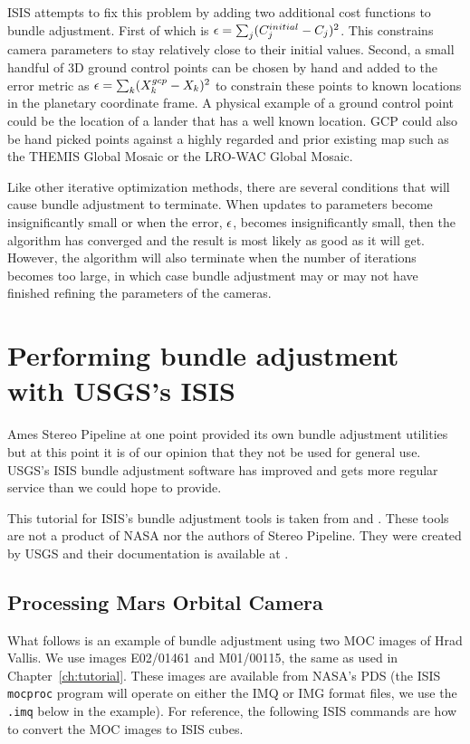 \ac{ISIS} attempts to fix this problem by adding two additional cost
functions to bundle adjustment. First of which is ${\bf \epsilon} =
\sum_j(C_j^{initial}-C_j)^2$. This constrains camera parameters to
stay relatively close to their initial values. Second, a small handful
of 3D ground control points can be chosen by hand and added to the
error metric as ${\bf \epsilon} = \sum_k(X_k^{gcp}-X_k)^2$ to
constrain these points to known locations in the planetary coordinate
frame. A physical example of a ground control point could be the
location of a lander that has a well known location. GCP could also be
hand picked points against a highly regarded and prior existing map
such as the THEMIS Global Mosaic or the LRO-WAC Global Mosaic.

Like other iterative optimization methods, there are several
conditions that will cause bundle adjustment to terminate. When
updates to parameters become insignificantly small or when the error,
${\bf \epsilon}$, becomes insignificantly small, then the algorithm
has converged and the result is most likely as good as it will get.
However, the algorithm will also terminate when the number of
iterations becomes too large, in which case bundle adjustment may or
may not have finished refining the parameters of the cameras.

\section{Performing bundle adjustment with USGS's ISIS}

Ames Stereo Pipeline at one point provided its own bundle adjustment
utilities but at this point it is of our opinion that they not be used
for general use. USGS's \ac{ISIS} bundle adjustment software has
improved and gets more regular service than we could hope to provide.

This tutorial for ISIS's bundle adjustment tools is taken from
\cite{lunokhod:controlnetwork} and \cite{lunokhod:gcp}. These tools
are not a product of NASA nor the authors of Stereo Pipeline. They
were created by USGS and their documentation is available at
\cite{isis:documentation}.

\subsection{Processing Mars Orbital Camera}
\label{sec:ba_example}

What follows is an example of bundle adjustment using two \ac{MOC}
images of Hrad Vallis. We use images E02/01461 and M01/00115, the same
as used in Chapter~\ref{ch:tutorial}. These images are available from
NASA's \ac{PDS} (the \ac{ISIS} \texttt{mocproc} program will operate
on either the IMQ or IMG format files, we use the \texttt{.imq} below
in the example).  For reference, the following \ac{ISIS} commands are
how to convert the \ac{MOC} images to \ac{ISIS} cubes.

